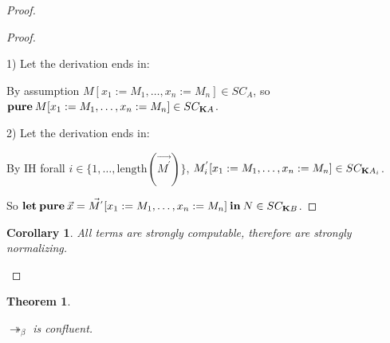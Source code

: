 \documentclass[a4paper]{article}
\newtheorem{theorem}{Theorem}
\newtheorem{col}{Corollary}
\begin{document}
\begin{proof}
\begin{proof}
  $ $

  1) Let the derivation ends in:

\begin{prooftree}
\end{prooftree}

  By assumption $M [x_1 := M_1,\dots,x_n := M_n] \in SC_A$, so ${\bf pure \:} M [x_1 := M_1,\dots,x_n := M_n] \in SC_{{\bf K}A}$.

\vspace{\baselineskip}

  2) Let the derivation ends in:
\begin{prooftree}
\end{prooftree}

By IH forall $i \in \{ 1,\dots,\text{length}(\vec{M^{'}}) \}$, $M_i^{'} [x_1 := M_1,\dots,x_n := M_n] \in SC_{{\bf K}A_i}$.

So ${\bf let \: pure \:} \vec{x} = \vec{M^{'}} [x_1 := M_1,\dots,x_n := M_n] {\: \bf in \:} N \in SC_{{\bf K} B}$.
\end{proof}

\begin{col}

  All terms are strongly computable, therefore are strongly normalizing.
\end{col}

\end{proof}

\begin{theorem}
  $ $

  $\twoheadrightarrow_{\beta}$ is confluent.
\end{theorem}
\end{document}
